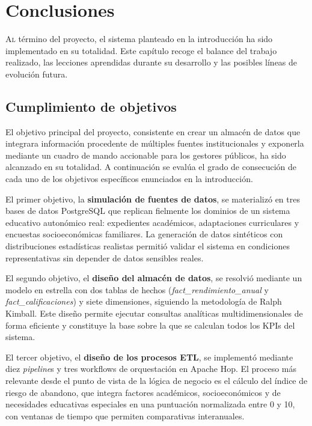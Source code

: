 \chapter{Conclusiones}
\label{chap:conclusiones}

\lettrine{A}{l} término del proyecto, el sistema planteado en la introducción ha sido implementado en su totalidad. Este capítulo recoge el balance del trabajo realizado, las lecciones aprendidas durante su desarrollo y las posibles líneas de evolución futura.

\section{Cumplimiento de objetivos}

El objetivo principal del proyecto, consistente en crear un almacén de datos que integrara información procedente de múltiples fuentes institucionales y exponerla mediante un cuadro de mando accionable para los gestores públicos, ha sido alcanzado en su totalidad. A continuación se evalúa el grado de consecución de cada uno de los objetivos específicos enunciados en la introducción.

El primer objetivo, la \textbf{simulación de fuentes de datos}, se materializó en tres bases de datos PostgreSQL que replican fielmente los dominios de un sistema educativo autonómico real: expedientes académicos, adaptaciones curriculares y encuestas socioeconómicas familiares. La generación de datos sintéticos con distribuciones estadísticas realistas permitió validar el sistema en condiciones representativas sin depender de datos sensibles reales.

El segundo objetivo, el \textbf{diseño del almacén de datos}, se resolvió mediante un modelo en estrella con dos tablas de hechos (\textit{fact\_rendimiento\_anual} y \textit{fact\_calificaciones}) y siete dimensiones, siguiendo la metodología de Ralph Kimball. Este diseño permite ejecutar consultas analíticas multidimensionales de forma eficiente y constituye la base sobre la que se calculan todos los KPIs del sistema.

El tercer objetivo, el \textbf{diseño de los procesos ETL}, se implementó mediante diez \textit{pipeline}s y tres workflows de orquestación en Apache Hop. El proceso más relevante desde el punto de vista de la lógica de negocio es el cálculo del índice de riesgo de abandono, que integra factores académicos, socioeconómicos y de necesidades educativas especiales en una puntuación normalizada entre 0 y 10, con ventanas de tiempo que permiten comparativas interanuales.

